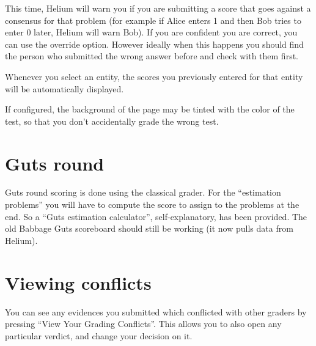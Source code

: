 This time, Helium will warn you if you are submitting
a score that goes against a consensus for that problem
(for example if Alice enters 1 and then Bob tries to enter 0 later,
Helium will warn Bob).
If you are confident you are correct, you can use the override option.
However ideally when this happens you should find the person
who submitted the wrong answer before and check with them first.

Whenever you select an entity,
the scores you previously entered for that
entity will be automatically displayed.

If configured, the background of the page may be tinted
with the color of the test, so that you don't accidentally grade
the wrong test.

\section{Guts round}
\begin{itemize}
	\ii Guts round scoring is done using the classical grader.
	\ii For the ``estimation problems'' you will have to compute the score
	to assign to the problems at the end.
	So a ``Guts estimation calculator'', self-explanatory,
	has been provided.
	\ii The old Babbage Guts scoreboard should still be working
	(it now pulls data from Helium).
\end{itemize}

\section{Viewing conflicts}
You can see any evidences you submitted which conflicted with other graders
by pressing ``View Your Grading Conflicts''.
This allows you to also open any particular verdict,
and change your decision on it.

